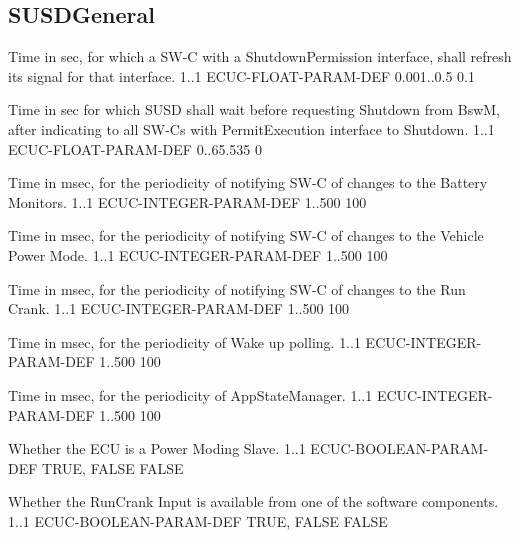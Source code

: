 

\subsection{SUSDGeneral}
\label{subsection:SUSDGen}

{
{Time in sec, for which a SW-C with a ShutdownPermission interface, shall refresh its signal for that interface.}
{1..1}
{ECUC-FLOAT-PARAM-DEF}
{0.001..0.5}
{0.1}}
{  }

{
{Time in sec for which SUSD shall wait before requesting Shutdown from BswM, after indicating to all SW-Cs with PermitExecution interface to Shutdown.}
{1..1}
{ECUC-FLOAT-PARAM-DEF}
{0..65.535}
{0}}
{}

{
{Time in msec, for the periodicity of notifying SW-C of changes to the Battery Monitors.}
{1..1}
{ECUC-INTEGER-PARAM-DEF}
{1..500}
{100}}
{}

{Time in msec, for the periodicity of notifying SW-C of changes to the Vehicle Power Mode.}
{1..1}
{ECUC-INTEGER-PARAM-DEF}
{1..500}
{100}

{
{Time in msec, for the periodicity of notifying SW-C of changes to the Run Crank.}
{1..1}
{ECUC-INTEGER-PARAM-DEF}
{1..500}
{100}

{
{Time in msec, for the periodicity of Wake up polling.}
{1..1}
{ECUC-INTEGER-PARAM-DEF}
{1..500}
{100}}
{}

{
{Time in msec, for the periodicity of AppStateManager.}
{1..1}
{ECUC-INTEGER-PARAM-DEF}
{1..500}
{100}}
{}

{Whether the ECU is a Power Moding Slave.}
{1..1}
{ECUC-BOOLEAN-PARAM-DEF}
{TRUE, FALSE}
{FALSE}}

{Whether the RunCrank Input is available from one of the software components.}
{1..1}
{ECUC-BOOLEAN-PARAM-DEF}
{TRUE, FALSE}
{FALSE}

